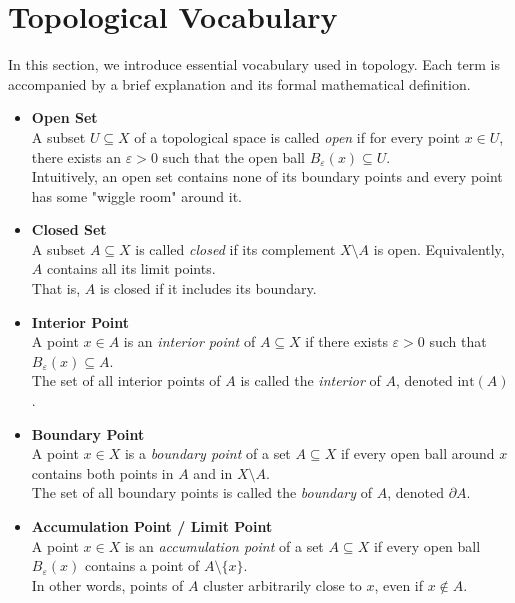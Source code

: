\section{Topological Vocabulary}

In this section, we introduce essential vocabulary used in topology. Each term is accompanied by a brief explanation and its formal mathematical definition.

\begin{itemize}

    \item \textbf{Open Set} \\
    A subset \( U \subseteq X \) of a topological space is called \emph{open} if for every point \( x \in U \), there exists an \( \varepsilon > 0 \) such that the open ball \( B_\varepsilon(x) \subseteq U \). \\
    Intuitively, an open set contains none of its boundary points and every point has some "wiggle room" around it.

    \item \textbf{Closed Set} \\
    A subset \( A \subseteq X \) is called \emph{closed} if its complement \( X \setminus A \) is open. Equivalently, \( A \) contains all its limit points. \\
    That is, \( A \) is closed if it includes its boundary.

    \item \textbf{Interior Point}\\
    A point \( x \in A \) is an \emph{interior point} of \( A \subseteq X \) if there exists \( \varepsilon > 0 \) such that \( B_\varepsilon(x) \subseteq A \). \\
    The set of all interior points of \( A \) is called the \emph{interior} of \( A \), denoted \( \mathrm{int}(A) \).

    \item \textbf{Boundary Point}\\
    A point \( x \in X \) is a \emph{boundary point} of a set \( A \subseteq X \) if every open ball around \( x \) contains both points in \( A \) and in \( X \setminus A \). \\
    The set of all boundary points is called the \emph{boundary} of \( A \), denoted \( \partial A \).

    \item \textbf{Accumulation Point / Limit Point}\\
    A point \( x \in X \) is an \emph{accumulation point} of a set \( A \subseteq X \) if every open ball \( B_\varepsilon(x) \) contains a point of \( A \setminus \{x\} \). \\
    In other words, points of \( A \) cluster arbitrarily close to \( x \), even if \( x \notin A \).


\end{itemize}
